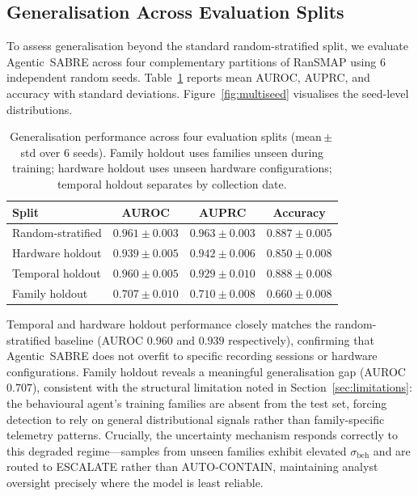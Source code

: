\documentclass[3p]{elsarticle}
\begin{document}
\subsection{Generalisation Across Evaluation Splits}
\label{sec:generalisation}

To assess generalisation beyond the standard random-stratified split, we evaluate Agentic~SABRE across four complementary partitions of RanSMAP using 6 independent random seeds. Table~\ref{tab:multiseed_splits} reports mean AUROC, AUPRC, and accuracy with standard deviations. Figure~\ref{fig:multiseed} visualises the seed-level distributions.

\begin{table}[ht]
\centering
\caption{Generalisation performance across four evaluation splits (mean\,$\pm$\,std over 6 seeds). Family holdout uses families unseen during training; hardware holdout uses unseen hardware configurations; temporal holdout separates by collection date.}
\label{tab:multiseed_splits}
\begin{tabular}{lccc}
\toprule
\textbf{Split} & \textbf{AUROC} & \textbf{AUPRC} & \textbf{Accuracy} \\
\midrule
Random-stratified & $0.961 \pm 0.003$ & $0.963 \pm 0.003$ & $0.887 \pm 0.005$ \\
Hardware holdout  & $0.939 \pm 0.005$ & $0.942 \pm 0.006$ & $0.850 \pm 0.008$ \\
Temporal holdout  & $0.960 \pm 0.005$ & $0.929 \pm 0.010$ & $0.888 \pm 0.008$ \\
Family holdout    & $0.707 \pm 0.010$ & $0.710 \pm 0.008$ & $0.660 \pm 0.008$ \\
\bottomrule
\end{tabular}
\end{table}

Temporal and hardware holdout performance closely matches the random-stratified baseline (AUROC $0.960$ and $0.939$ respectively), confirming that Agentic~SABRE does not overfit to specific recording sessions or hardware configurations. Family holdout reveals a meaningful generalisation gap (AUROC $0.707$), consistent with the structural limitation noted in Section~\ref{sec:limitations}: the behavioural agent's training families are absent from the test set, forcing detection to rely on general distributional signals rather than family-specific telemetry patterns. Crucially, the uncertainty mechanism responds correctly to this degraded regime---samples from unseen families exhibit elevated $\sigma_{\mathrm{beh}}$ and are routed to \textsc{ESCALATE} rather than \textsc{AUTO-CONTAIN}, maintaining analyst oversight precisely where the model is least reliable.
\end{document}
